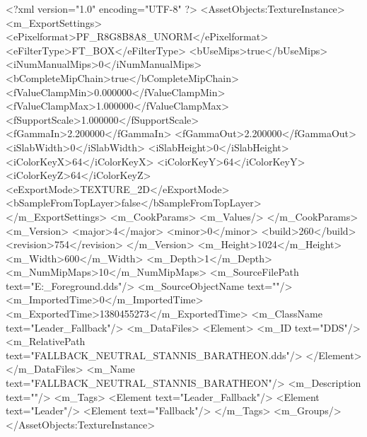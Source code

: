 <?xml version="1.0" encoding="UTF-8" ?>
<AssetObjects:TextureInstance>
	<m_ExportSettings>
		<ePixelformat>PF_R8G8B8A8_UNORM</ePixelformat>
		<eFilterType>FT_BOX</eFilterType>
		<bUseMips>true</bUseMips>
		<iNumManualMips>0</iNumManualMips>
		<bCompleteMipChain>true</bCompleteMipChain>
		<fValueClampMin>0.000000</fValueClampMin>
		<fValueClampMax>1.000000</fValueClampMax>
		<fSupportScale>1.000000</fSupportScale>
		<fGammaIn>2.200000</fGammaIn>
		<fGammaOut>2.200000</fGammaOut>
		<iSlabWidth>0</iSlabWidth>
		<iSlabHeight>0</iSlabHeight>
		<iColorKeyX>64</iColorKeyX>
		<iColorKeyY>64</iColorKeyY>
		<iColorKeyZ>64</iColorKeyZ>
		<eExportMode>TEXTURE_2D</eExportMode>
		<bSampleFromTopLayer>false</bSampleFromTopLayer>
	</m_ExportSettings>
	<m_CookParams>
		<m_Values/>
	</m_CookParams>
	<m_Version>
		<major>4</major>
		<minor>0</minor>
		<build>260</build>
		<revision>754</revision>
	</m_Version>
	<m_Height>1024</m_Height>
	<m_Width>600</m_Width>
	<m_Depth>1</m_Depth>
	<m_NumMipMaps>10</m_NumMipMaps>
	<m_SourceFilePath text="E:\Jordi\Escritorio\ModdingIcons\SOIAF\Leaders\Stannis_Foreground.dds"/>
	<m_SourceObjectName text=""/>
	<m_ImportedTime>0</m_ImportedTime>
	<m_ExportedTime>1380455273</m_ExportedTime>
	<m_ClassName text="Leader_Fallback"/>
	<m_DataFiles>
		<Element>
			<m_ID text="DDS"/>
			<m_RelativePath text="FALLBACK_NEUTRAL_STANNIS_BARATHEON.dds"/>
		</Element>
	</m_DataFiles>
	<m_Name text="FALLBACK_NEUTRAL_STANNIS_BARATHEON"/>
	<m_Description text=""/>
	<m_Tags>
		<Element text="Leader_Fallback"/>
		<Element text="Leader"/>
		<Element text="Fallback"/>
	</m_Tags>
	<m_Groups/>
</AssetObjects:TextureInstance>

 